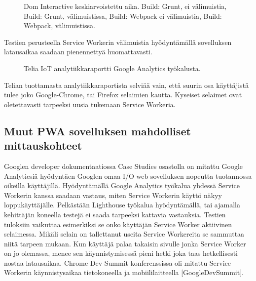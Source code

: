 \documentclass{tktltiki}
\begin{document}
\begin{figure}[h]
\begin{center}
\caption{Dom Interactive keskiarvoistettu aika. Build: Grunt, ei välimuistia, Build: Grunt, välimuistissa, Build: Webpack ei välimuistia, Build: Webpack, välimuistissa.}
\label{Dom Interactive palkit}
\end{center}
\end{figure}

Testien perusteella Service Workerin välimuistia hyödyntämällä sovelluksen latausaikaa saadaan pienennettyä huomattavasti. 

\begin{figure}[h]
\begin{center}
\caption{Telia IoT analytiikkaraportti Google Analytics työkalusta.}
\label{Google Analytics raportti Telia IoT}
\end{center}
\end{figure}

Telian tuottamasta analytiikkaraportista selviää vain, että suurin osa käyttäjistä tulee joko Google-Chrome, tai Firefox selaimien kautta. Kyseiset selaimet ovat oletettavasti tarpeeksi uusia tukemaan Service Workeria.

\subsection{Muut PWA sovelluksen mahdolliset mittauskohteet}

Googlen developer dokumentaatiossa Case Studies osastolla on mitattu Google Analyticsiä hyödyntäen Googlen omaa I/O web sovelluksen nopeutta tuotannossa oikeilla käyttäjillä. Hyödyntämällä Google Analytics työkalua yhdessä Service Workerin kanssa saadaan vastaus, miten Service Workerin käyttö näkyy loppukäyttäjälle. Pelkästään Lighthouse työkalua hyödyntämällä, tai ajamalla kehittäjän koneella testejä ei saada tarpeeksi kattavia vastauksia. Testien tuloksiin vaikuttaa esimerkiksi se onko käyttäjän Service Worker aktiivinen selaimessa. Mikäli selain on tallettanut useita Service Workereita se sammuttaa niitä tarpeen mukaan. Kun käyttäjä palaa takaisin sivulle jonka Service Worker on jo olemassa, menee sen käynnistymisessä pieni hetki joka taas hetkellisesti nostaa latausaikaa. Chrome Dev Summit konferenssissa oli mitattu Service Workerin käynnistysaikaa tietokoneella ja mobiililaitteella [GoogleDevSummit]. 
\end{document}
